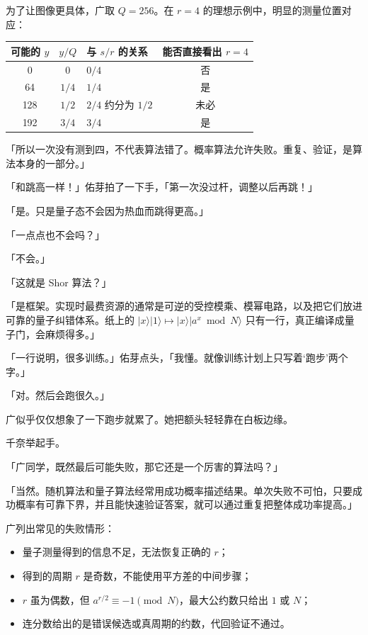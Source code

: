 为了让图像更具体，广取 $Q=256$。在 $r=4$ 的理想示例中，明显的测量位置对应：

\begin{center}
\small
\setlength{\tabcolsep}{4pt}
\begin{tabular}{c c L{3.0cm} c}
\toprule
可能的 $y$ & $y/Q$ & 与 $s/r$ 的关系 & 能否直接看出 $r=4$ \\
   & $0$   & $0/4$             & 否 \\
64  & $1/4$ & $1/4$             & 是 \\
128 & $1/2$ & $2/4$ 约分为 $1/2$ & 未必 \\
192 & $3/4$ & $3/4$             & 是 \\
\bottomrule
\end{tabular}
\end{center}

「所以一次没有测到四，不代表算法错了。概率算法允许失败。重复、验证，是算法本身的一部分。」

「和跳高一样！」佑芽拍了一下手，「第一次没过杆，调整以后再跳！」

「是。只是量子态不会因为热血而跳得更高。」

「一点点也不会吗？」

「不会。」

「这就是 Shor 算法？」

「是框架。实现时最费资源的通常是可逆的受控模乘、模幂电路，以及把它们放进可靠的量子纠错体系。纸上的 $\lvert x\rangle\lvert1\rangle\mapsto\lvert x\rangle\lvert a^x\bmod N\rangle$ 只有一行，真正编译成量子门，会麻烦得多。」

「一行说明，很多训练。」佑芽点头，「我懂。就像训练计划上只写着‘跑步’两个字。」

「对。然后会跑很久。」

广似乎仅仅想象了一下跑步就累了。她把额头轻轻靠在白板边缘。

千奈举起手。

「广同学，既然最后可能失败，那它还是一个厉害的算法吗？」

「当然。随机算法和量子算法经常用成功概率描述结果。单次失败不可怕，只要成功概率有可靠下界，并且能快速验证答案，就可以通过重复把整体成功率提高。」

广列出常见的失败情形：

\begin{itemize}[leftmargin=2em]
  \item 量子测量得到的信息不足，无法恢复正确的 $r$；
  \item 得到的周期 $r$ 是奇数，不能使用平方差的中间步骤；
  \item $r$ 虽为偶数，但 $a^{r/2}\equiv-1\pmod N$，最大公约数只给出 $1$ 或 $N$；
  \item 连分数给出的是错误候选或真周期的约数，代回验证不通过。
\end{itemize}

